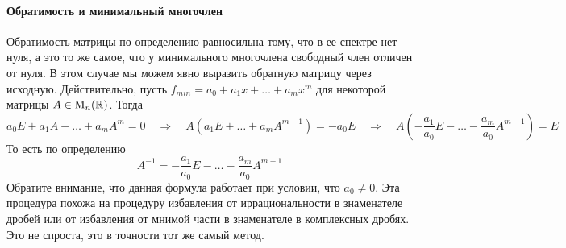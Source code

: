 \paragraph{Обратимость и минимальный многочлен}

Обратимость матрицы по определению равносильна тому, что в ее спектре нет нуля, а это то же самое, что у минимального многочлена свободный член отличен от нуля.
В этом случае мы можем явно выразить обратную матрицу через исходную.
Действительно, пусть $f_{min} = a_0 + a_1 x + \ldots + a_m x^m$ для некоторой матрицы $A\in \operatorname{M}_{n}(\mathbb R)$.
Тогда
\[
a_0E + a_1 A + \ldots + a_m A^m =  0 \quad\Rightarrow\quad  A (a_1 E + \ldots + a_m A^{m-1}) =  -a_0 E \quad\Rightarrow\quad A \left(-\frac{a_1}{a_0} E - \ldots -\frac{ a_m}{a_0} A^{m-1}\right) = E
\]
То есть по определению
\[
A^{-1} = -\frac{a_1}{a_0} E - \ldots -\frac{ a_m}{a_0} A^{m-1}
\]
Обратите внимание, что данная формула работает при условии, что $a_0 \neq 0$.
Эта процедура похожа на процедуру избавления от иррациональности в знаменателе дробей или от избавления от мнимой части в знаменателе в комплексных дробях.
Это не спроста, это в точности тот же самый метод.
